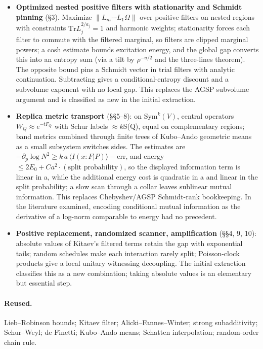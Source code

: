 \documentclass[11pt]{article}
\begin{document}
\begin{itemize}
\item \textbf{Optimized nested positive filters with stationarity and Schmidt pinning} (\S{}3). Maximize $\|L_m\cdots L_1\Omega\|$ over positive filters on nested regions with constraints $\mathrm{Tr}L_j^{2/a_j}=1$ and harmonic weights; stationarity forces each filter to commute with the filtered marginal, so filters are clipped marginal powers; a cosh estimate bounds excitation energy, and the global gap converts this into an entropy sum (via a tilt by $\rho^{-u/2}$ and the three-lines theorem). The opposite bound pins a Schmidt vector in trial filters with analytic continuation. Subtracting gives a conditional-entropy discount and a subvolume exponent with no local gap. This replaces the AGSP subvolume argument and is classified as new in the initial extraction.
\item \textbf{Replica metric transport} (\S{}\S{}5--8): on $\mathrm{Sym}^k(V)$, central operators $W_Q\approx e^{-tF_Q}$ with Schur labels $\approx k$\textperiodcentered{}S(Q), equal on complementary regions; band metrics combined through finite trees of Kubo--Ando geometric means as a small subsystem switches sides. The estimates are $-\partial_p\log N^2\ge k\,a\,\langle I(x{:}F|P)\rangle-$err, and energy $\le 2E_0+Ca^2\cdot(\text{split probability})$, so the displayed information term is linear in a, while the additional energy cost is quadratic in a and linear in the split probability; a slow scan through a collar leaves sublinear mutual information. This replaces Chebyshev/AGSP Schmidt-rank bookkeeping. In the literature examined, encoding conditional mutual information as the derivative of a log-norm comparable to energy had no precedent.
\item \textbf{Positive replacement, randomized scanner, amplification} (\S{}\S{}4, 9, 10): absolute values of Kitaev's filtered terms retain the gap with exponential tails; random schedules make each interaction rarely split; Poisson-clock products give a local unitary witnessing decoupling. The initial extraction classifies this as a new combination; taking absolute values is an elementary but essential step.
\end{itemize}

\paragraph{Reused.}

Lieb--Robinson bounds; Kitaev filter; Alicki--Fannes--Winter; strong subadditivity; Schur--Weyl; de Finetti; Kubo--Ando means; Schatten interpolation; random-order chain rule.
\end{document}
